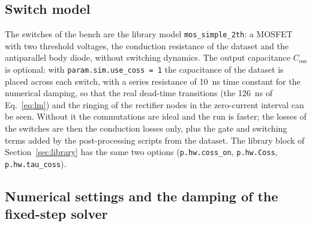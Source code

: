 \documentclass[12pt,a4paper]{scrartcl}
\newcommand{\ped}[1]{_{\mathrm{#1}}}
\newcommand{\code}[1]{\texttt{#1}}
\begin{document}
\begin{onehalfspace}
\subsection{Switch model}
\label{sec:switch}

The switches of the bench are the library model \code{mos\_simple\_2th}: a MOSFET with two threshold voltages, the conduction resistance of the dataset and the antiparallel body diode, without switching dynamics. The output capacitance $C\ped{oss}$ is optional: with \code{param.sim.use\_coss = 1} the capacitance of the dataset is placed across each switch, with a series resistance of \SI{10}{\nano\second} time constant for the numerical damping, so that the real dead-time transitions (the \SI{126}{\nano\second} of Eq.~\eqref{eq:lm}) and the ringing of the rectifier nodes in the zero-current interval can be seen. Without it the commutations are ideal and the run is faster; the losses of the switches are then the conduction losses only, plus the gate and switching terms added by the post-processing scripts from the dataset. The library block of Section~\ref{sec:library} has the same two options (\code{p.hw.coss\_on}, \code{p.hw.Coss}, \code{p.hw.tau\_coss}).

\subsection{Numerical settings and the damping of the fixed-step solver}
\label{sec:numerics}


\end{onehalfspace}
\end{document}
